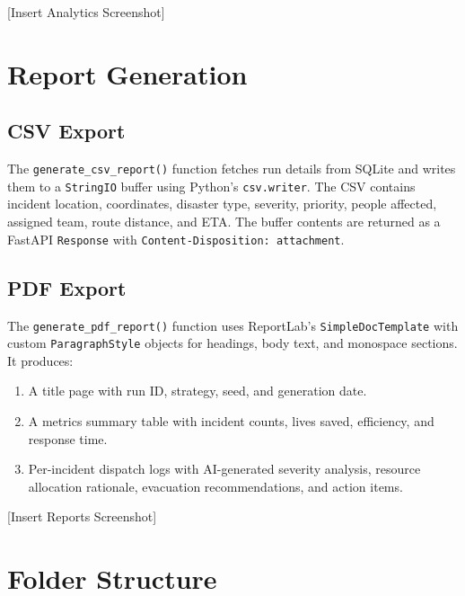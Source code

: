 [Insert Analytics Screenshot]

\section{Report Generation}
\label{sec:impl_reports}

\subsection{CSV Export}

The \texttt{generate\_csv\_report()} function fetches run details from SQLite and writes them to a \texttt{StringIO} buffer using Python's \texttt{csv.writer}. The CSV contains incident location, coordinates, disaster type, severity, priority, people affected, assigned team, route distance, and ETA. The buffer contents are returned as a FastAPI \texttt{Response} with \texttt{Content-Disposition: attachment}.

\subsection{PDF Export}

The \texttt{generate\_pdf\_report()} function uses ReportLab's \texttt{SimpleDocTemplate} with custom \texttt{ParagraphStyle} objects for headings, body text, and monospace sections. It produces:

\begin{enumerate}[leftmargin=*]
    \item A title page with run ID, strategy, seed, and generation date.
    \item A metrics summary table with incident counts, lives saved, efficiency, and response time.
    \item Per-incident dispatch logs with AI-generated severity analysis, resource allocation rationale, evacuation recommendations, and action items.
\end{enumerate}

[Insert Reports Screenshot]

\section{Folder Structure}
\label{sec:impl_folder}

